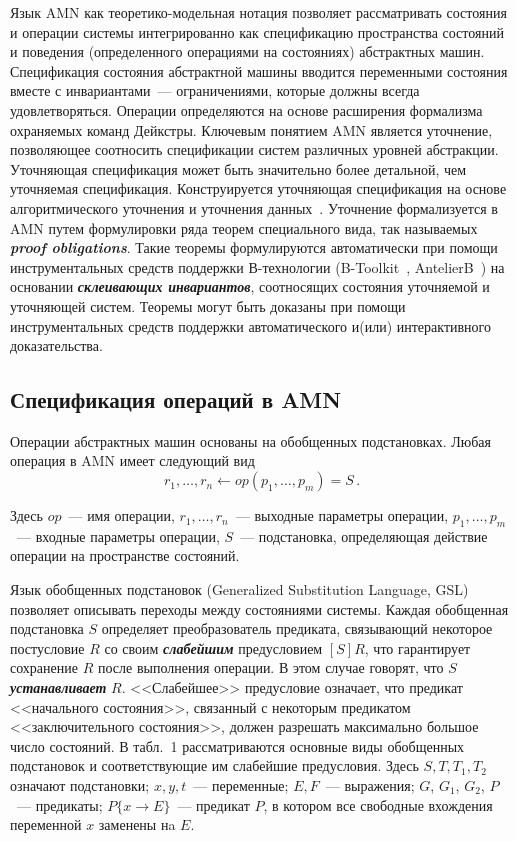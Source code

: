 \begin{multicols}{2}
Язык AMN как теоретико-модельная нотация позволяет рассматривать
состояния и операции сис\-те\-мы интегрированно как спецификацию
пространства состояний и поведения (определен\-ного операциями на
состояниях) абстрактных машин. Спецификация состояния абстрактной
машины вводится переменными состояния вместе с инвариантами~---
ограничениями, которые должны всегда удовлетворяться. Операции
определяются на основе расширения формализма охраняемых команд
Дейкстры. Ключевым понятием AMN является уточнение, позволяющее
соотносить спецификации систем различных уровней абстракции.
Уточняющая спецификация может быть значительно более детальной, чем
уточняемая спецификация. Конструируется уточняющая спецификация на
основе алгоритмического уточнения и уточнения данных~\cite{Ab96}. Уточнение
формализуется в AMN путем формулировки ряда теорем специального
вида, так называемых {\bfseries\textit{proof obligations}}. Такие теоремы
формулируются автоматически при помощи инструментальных средств
поддержки В-технологии (B-Toolkit~\cite{btoolkit},
AntelierB~\cite{antelierb}) на основании
{\bfseries\textit{склеивающих инвариантов}}, соотносящих состояния
уточняемой и уточняющей систем. Теоремы могут быть доказаны при
помощи инструментальных средств поддержки автоматического и(или)
интерактивного доказательства.

\subsection{Спецификация операций в AMN}

Операции абстрактных машин основаны на обобщенных подстановках.
Любая операция в AMN имеет следующий вид
$$
r_1, \dots , r_n \leftarrow op (p_1, \dots , p_m) = S\,.
$$

Здесь $op$~--- имя операции,
$r_1, \dots , r_n$~--- выходные параметры операции,
$p_1, \dots , p_m$~--- входные параметры операции,
$S$~--- подстановка, определяющая действие операции
на пространстве состояний.

Язык обобщенных подстановок (Generalized Substitution Language, GSL)
позволяет описывать переходы между состояниями системы.
Каждая обобщенная подстановка $S$ определяет преобразователь
предиката, связывающий некоторое пост\-усло\-вие $R$ со своим
{\bfseries\textit{слабейшим}} предусловием $[S] R$, что гарантирует
сохранение $R$ после выполнения операции. В этом
случае говорят, что $S $ {\bfseries\textit{устанавливает}} $R$. <<Слабейшее>>
предусловие означает, что предикат <<начального состояния>>,
связанный с некоторым предикатом <<заключительного состояния>>,
должен разрешать максимально большое чис\-ло состояний.
В табл.~1 рассматриваются основные виды
обобщенных подстановок и соответствующие им слабейшие предусловия.
Здесь $S,T, T_1, T_2$ означают подстановки; $x,y, t$~--- переменные;
$E, F$~--- выражения; $G$, $G_1$, $G_2$, $P$~--- предикаты;
$P\{ x\rightarrow E\}$~--- предикат $P$,
в котором все свободные вхождения переменной $x$ заменены нa $E$.


\end{multicols}
